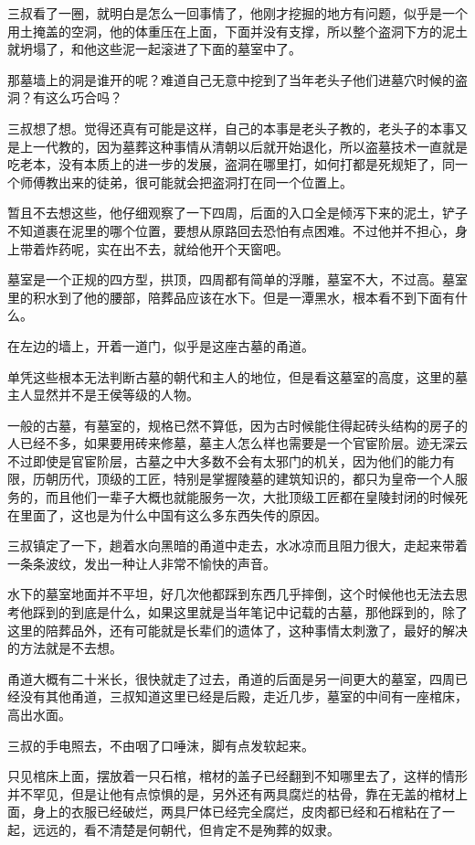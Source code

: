 三叔看了一圈，就明白是怎么一回事情了，他刚才挖掘的地方有问题，似乎是一个用土掩盖的空洞，他的体重压在上面，下面并没有支撑，所以整个盗洞下方的泥土就坍塌了，和他这些泥一起滚进了下面的墓室中了。

那墓墙上的洞是谁开的呢？难道自己无意中挖到了当年老头子他们进墓穴时候的盗洞？有这么巧合吗？

三叔想了想。觉得还真有可能是这样，自己的本事是老头子教的，老头子的本事又是上一代教的，因为墓葬这种事情从清朝以后就开始退化，所以盗墓技术一直就是吃老本，没有本质上的进一步的发展，盗洞在哪里打，如何打都是死规矩了，同一个师傅教出来的徒弟，很可能就会把盗洞打在同一个位置上。

暂且不去想这些，他仔细观察了一下四周，后面的入口全是倾泻下来的泥土，铲子不知道裹在泥里的哪个位置，要想从原路回去恐怕有点困难。不过他并不担心，身上带着炸药呢，实在出不去，就给他开个天窗吧。

墓室是一个正规的四方型，拱顶，四周都有简单的浮雕，墓室不大，不过高。墓室里的积水到了他的腰部，陪葬品应该在水下。但是一潭黑水，根本看不到下面有什么。

在左边的墙上，开着一道门，似乎是这座古墓的甬道。

单凭这些根本无法判断古墓的朝代和主人的地位，但是看这墓室的高度，这里的墓主人显然并不是王侯等级的人物。

一般的古墓，有墓室的，规格已然不算低，因为古时候能住得起砖头结构的房子的人已经不多，如果要用砖来修墓，墓主人怎么样也需要是一个官宦阶层。迹无深云不过即使是官宦阶层，古墓之中大多数不会有太邪门的机关，因为他们的能力有限，历朝历代，顶级的工匠，特别是掌握陵墓的建筑知识的，都只为皇帝一个人服务的，而且他们一辈子大概也就能服务一次，大批顶级工匠都在皇陵封闭的时候死在里面了，这也是为什么中国有这么多东西失传的原因。

三叔镇定了一下，趟着水向黑暗的甬道中走去，水冰凉而且阻力很大，走起来带着一条条波纹，发出一种让人非常不愉快的声音。

水下的墓室地面并不平坦，好几次他都踩到东西几乎摔倒，这个时候他也无法去思考他踩到的到底是什么，如果这里就是当年笔记中记载的古墓，那他踩到的，除了这里的陪葬品外，还有可能就是长辈们的遗体了，这种事情太刺激了，最好的解决的方法就是不去想。

甬道大概有二十米长，很快就走了过去，甬道的后面是另一间更大的墓室，四周已经没有其他甬道，三叔知道这里已经是后殿，走近几步，墓室的中间有一座棺床，高出水面。

三叔的手电照去，不由咽了口唾沫，脚有点发软起来。

只见棺床上面，摆放着一只石棺，棺材的盖子已经翻到不知哪里去了，这样的情形并不罕见，但是让他有点惊惧的是，另外还有两具腐烂的枯骨，靠在无盖的棺材上面，身上的衣服已经破烂，两具尸体已经完全腐烂，皮肉都已经和石棺粘在了一起，远远的，看不清楚是何朝代，但肯定不是殉葬的奴隶。


